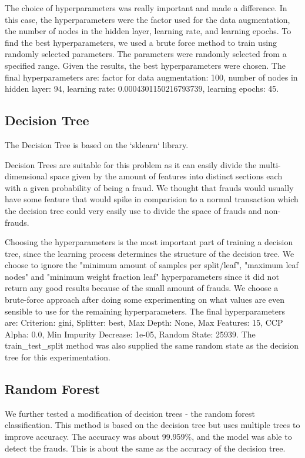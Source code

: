 \documentclass[a4paper, 10pt, conference]{ieeeconf}      %
\begin{document}
The choice of hyperparameters was really important and made a difference. In this case, the hyperparameters were the factor used for the data augmentation, the number of nodes in the hidden layer, learning rate, and learning epochs. 
To find the best hyperparameters, we used a brute force method to train using randomly selected parameters. The parameters were randomly selected from a specified range. 
Given the results, the best hyperparameters were chosen. 
The final hyperparameters are: factor for data augmentation: 100, number of nodes in hidden layer: 94, learning rate: 0.0004301150216793739, learning epochs: 45.

\subsection{Decision Tree}

The Decision Tree is based on the `sklearn` library. 

Decision Trees are suitable for this problem as it can easily divide the multi-dimensional space given by the amount of features into distinct sections each with a given probability of being a fraud.
We thought that frauds would usually have some feature that would spike in comparision to a normal transaction which the decision tree could very easily use to divide the space of frauds and non-frauds.

Choosing the hyperparameters is the most important part of training a decision tree, since the learning process determines the structure of the decision tree.
We choose to ignore the "minimum amount of samples per split/leaf", "maximum leaf nodes" and "minimum weight fraction leaf" hyperparameters since it did not return any good results because of the small amount of frauds.
We choose a brute-force approach after doing some experimenting on what values are even sensible to use for the remaining hyperparameters.
The final hyperparameters are: Criterion: gini, Splitter: best, Max Depth: None, Max Features: 15, CCP Alpha: 0.0, Min Impurity Decrease: 1e-05, Random State: 25939.
The train\_test\_split method was also supplied the same random state as the decision tree for this experimentation.

\subsection{Random Forest}

We further tested a modification of decision trees - the random forest classification. This method is based on the decision tree but uses multiple trees to improve accuracy. 
The accuracy was about 99.959\%, and the model was able to detect the frauds. This is about the same as the accuracy of the decision tree.
\end{document}

